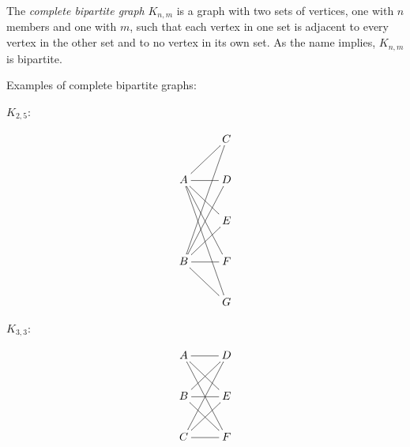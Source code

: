 \documentclass{article}
\begin{document}
The \emph{complete bipartite graph} $K_{n,m}$ is a graph with two sets of vertices, one with $n$ members and one with $m$, such that each vertex in one set is adjacent to every vertex in the other set and to no vertex in its own set.  As the name implies, $K_{n,m}$ is bipartite.

Examples of complete bipartite graphs:

$K_{2,5}$:

$$\xymatrix{
  & C \\
A \ar@{-}[ur] \ar@{-}[r] \ar@{-}[dr] \ar@{-}[ddr] \ar@{-}[dddr] & D \\
  & E \\
B \ar@{-}[uuur] \ar@{-}[uur] \ar@{-}[ur] \ar@{-}[r] \ar@{-}[dr] & F \\
  & G
}$$

$K_{3,3}$:

$$\xymatrix{
A \ar@{-}[r] \ar@{-}[dr] \ar@{-}[ddr] & D \\
B \ar@{-}[ur] \ar@{-}[r] \ar@{-}[dr] & E \\
C \ar@{-}[uur] \ar@{-}[ur] \ar@{-}[r] & F 
}$$
\end{document}
